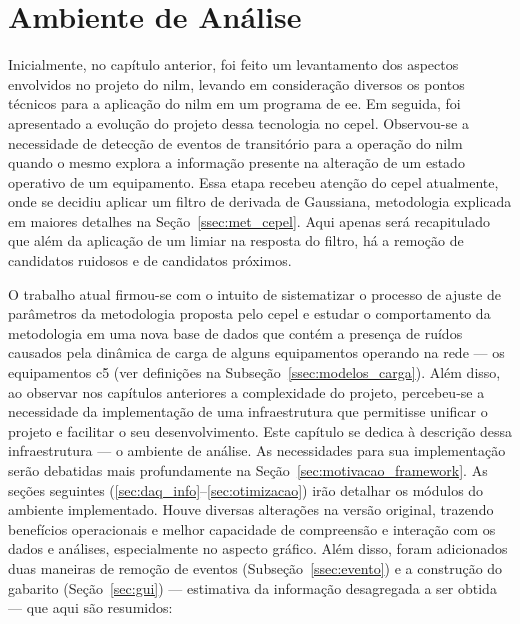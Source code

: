 \chapter{Ambiente de Análise}
\label{chap:framework}

Inicialmente, no capítulo anterior, foi feito um levantamento dos
aspectos envolvidos no projeto do \acs{nilm}, levando em consideração
diversos os pontos técnicos para a aplicação do \acs{nilm} em um programa
de \acs{ee}. Em seguida, foi apresentado a evolução do projeto dessa
tecnologia no \acs{cepel}.  Observou-se a necessidade de detecção de
eventos de transitório para a operação do \acs{nilm} quando o mesmo
explora a informação presente na alteração de um estado operativo de
um equipamento. Essa etapa recebeu atenção do \acs{cepel} atualmente,
onde se decidiu aplicar um filtro de derivada de Gaussiana,
metodologia explicada em maiores detalhes na
Seção~\ref{ssec:met_cepel}. Aqui apenas será recapitulado que além da
aplicação de um limiar na resposta do filtro, há a remoção de
candidatos ruidosos e de candidatos próximos.

O trabalho atual firmou-se com o intuito de sistematizar o processo de
ajuste de parâmetros da metodologia proposta pelo \acs{cepel} e
estudar o comportamento da metodologia em uma nova base de dados que
contém a presença de ruídos causados pela dinâmica de carga
de alguns equipamentos operando na rede --- os equipamentos
\acs{c5} (ver definições na Subseção~\ref{ssec:modelos_carga}). 
Além disso, ao observar nos capítulos anteriores a complexidade do
projeto, percebeu-se a necessidade da implementação de uma
infraestrutura que permitisse unificar o projeto e facilitar o seu
desenvolvimento. Este capítulo se dedica à descrição dessa
infraestrutura --- o ambiente de análise. As necessidades para sua
implementação serão debatidas mais profundamente na
Seção~\ref{sec:motivacao_framework}. As seções seguintes
(\ref{sec:daq_info}--\ref{sec:otimizacao}) irão detalhar os módulos do
ambiente implementado. Houve diversas alterações na versão original,
trazendo benefícios operacionais e melhor capacidade de compreensão e
interação com os dados e análises, especialmente no aspecto gráfico.
Além disso, foram adicionados duas maneiras de remoção de eventos
(Subseção~\ref{ssec:evento}) e a construção do gabarito
(Seção~\ref{sec:gui}) --- estimativa da informação desagregada a ser
obtida --- que aqui são resumidos:

